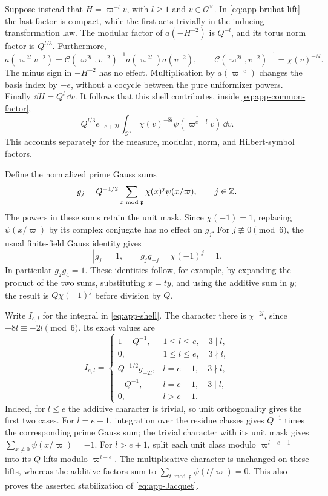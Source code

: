 Suppose instead that \(H=\varpi^{-l}v\), with \(l\ge1\) and
\(v\in\mathcal O^\times\).  In \eqref{eq:app-bruhat-lift} the last
factor is compact, while the first acts trivially in the inducing
transformation law.  The modular factor of \(a(-H^{-2})\) is
\(Q^{-l}\), and its torus norm factor is \(Q^{l/3}\).  Furthermore,
\[
 a(\varpi^{2l}v^{-2})
   =\mathcal C(\varpi^{2l},v^{-2})^{-1}
       a(\varpi^{2l})a(v^{-2}),\qquad
 \mathcal C(\varpi^{2l},v^{-2})^{-1}=\chi(v)^{-8l}.
\]
The minus sign in \(-H^{-2}\) has no effect.  Multiplication by
\(a(\varpi^{-e})\) changes the basis index by \(-e\), without a
cocycle between the pure uniformizer powers.  Finally
\(\dd H=Q^l\,\dd v\).  It follows that this shell contributes,
inside \eqref{eq:app-common-factor},
\begin{equation}\label{eq:app-shell}
 Q^{l/3}e_{-e+2l}
       \int_{\mathcal O^\times}
         \chi(v)^{-8l}\overline{\psi(\varpi^{e-l}v)}\,\dd v.
\end{equation}
This accounts separately for the measure, modular, norm, and
Hilbert-symbol factors.

Define the normalized prime Gauss sums
\[
 g_j=Q^{-1/2}\sum_{x\bmod\mathfrak p}
          \chi(x)^j\psi(x/\varpi),\qquad j\in\mathbb{Z}.
\]
The powers in these sums retain the unit mask.  Since
\(\chi(-1)=1\), replacing \(\psi(x/\varpi)\) by its complex
conjugate has no effect on \(g_j\).  For \(j\not\equiv0\pmod6\),
the usual finite-field Gauss identity gives
\[
 |g_j|=1,\qquad g_jg_{-j}=\chi(-1)^j=1.
\]
In particular \(g_2g_4=1\).  These identities follow, for example,
by expanding the product of the two sums, substituting \(x=ty\),
and using the additive sum in \(y\); the result is
\(Q\chi(-1)^j\) before division by \(Q\).

Write \(I_{e,l}\) for the integral in \eqref{eq:app-shell}.  The
character there is \(\chi^{-2l}\), since \(-8l\equiv-2l\pmod6\).
Its exact values are
\begin{equation}\label{eq:app-shell-integrals}
 I_{e,l}=
 \begin{cases}
  1-Q^{-1},&1\le l\le e,\quad 3\mid l,\\
  0,&1\le l\le e,\quad 3\nmid l,\\
  Q^{-1/2}g_{-2l},&l=e+1,\quad 3\nmid l,\\
  -Q^{-1},&l=e+1,\quad 3\mid l,\\
  0,&l>e+1.
 \end{cases}
\end{equation}
Indeed, for \(l\le e\) the additive character is trivial, so unit
orthogonality gives the first two cases.  For \(l=e+1\), integration
over the residue classes gives \(Q^{-1}\) times the corresponding
prime Gauss sum; the trivial character with its unit mask gives
\(\sum_{x\ne0}\psi(x/\varpi)=-1\).  For \(l>e+1\), split each unit
class modulo \(\varpi^{l-e-1}\) into its \(Q\) lifts modulo
\(\varpi^{l-e}\).  The multiplicative character is unchanged on
these lifts, whereas the additive factors sum to
\(\sum_{t\bmod\mathfrak p}\psi(t/\varpi)=0\).
This also proves the asserted stabilization of
\eqref{eq:app-Jacquet}.

